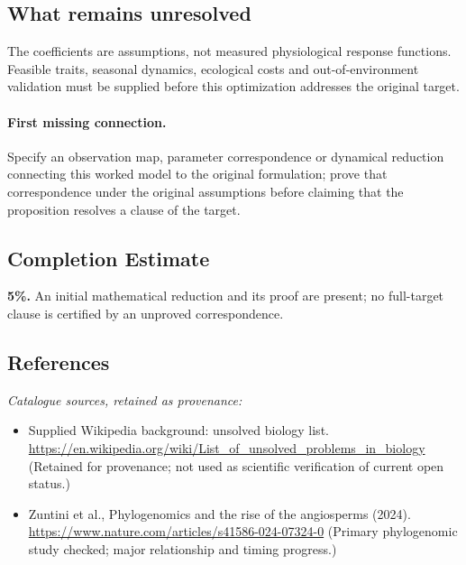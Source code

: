\documentclass[11pt]{article}
\begin{document}
\subsection{What remains unresolved}
The coefficients are assumptions, not measured physiological response functions. Feasible traits, seasonal dynamics, ecological costs and out-of-environment validation must be supplied before this optimization addresses the original target.
\paragraph{First missing connection.} Specify an observation map, parameter correspondence or dynamical reduction connecting this worked model to the original formulation; prove that correspondence under the original assumptions before claiming that the proposition resolves a clause of the target.
\subsection{Completion Estimate}
\textbf{5\%.} An initial mathematical reduction and its proof are present; no full-target clause is certified by an unproved correspondence.
\subsection{References}
\noindent\emph{Catalogue sources, retained as provenance:}
\begin{itemize}
\item Supplied Wikipedia background: unsolved biology list. \url{https://en.wikipedia.org/wiki/List_of_unsolved_problems_in_biology} (Retained for provenance; not used as scientific verification of current open status.)
\item Zuntini et al., Phylogenomics and the rise of the angiosperms (2024). \url{https://www.nature.com/articles/s41586-024-07324-0} (Primary phylogenomic study checked; major relationship and timing progress.)
\end{itemize}
\end{document}
